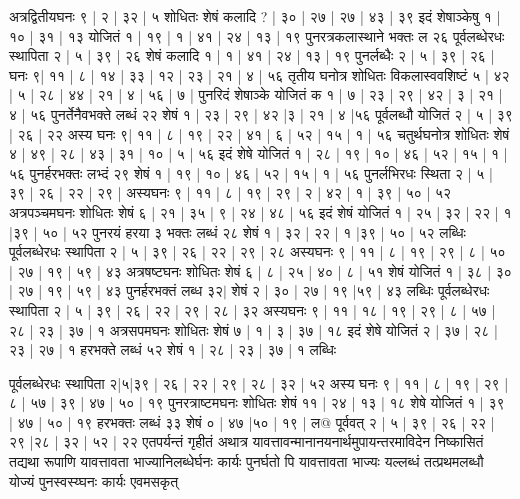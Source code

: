 \documentclass[12pt]{article}
\begin{document}
{अत्रद्वितीयघनः ९ | २ | ३२ | ५ शोधितः शेषं कलादि ? | ३० | २७ | २७ | ४३ | ३९ इदं शेषाञ्केषु १ |
१० | ३१ | १३ योजितं १ | १९ | १ | ४१ | २४ | १३ | १९ पुनरत्रकलास्थाने भक्तः ल २६ पूर्वलब्धेरधः
स्थापिता २ | ५ | ३९ | २६ शेषं कलादि १ | १ | ४१ | २४ | १३ | १९ पुनर्लब्धैः २ | ५ | ३९ | २६ | घनः ९| ११ |
८ | १४ | ३३ | १२ | २३ | २१ | ४ | ५६ तृतीय घनोत्र शोधितः विकलास्ववशिष्टं ५ | ४२ | ५ | २८ | ४४ | २१ | ४ |
५६ | ७ | पुनरिदं शेषाञ्के योजितं क १ | ७ | २३ | २९ | ४२ | ३ | २१ | ४ | ५६ पुनर्तेनैवभक्ते लब्धं
२२ शेषं १ | २३ | २९ | ४२ |३ | २१ | ४ |५६ पूर्वलब्धौ योजितं २ | ५ | ३९ | २६ | २२ अस्य घनः ९| ११ | ८ |
१९ | २२ | ४१ | ६ | ५२ | १५ | १ | ५६ चतुर्थघनोत्र शोधितः शेषं ४ | ४९ | २८ | ४३ | ३१ | १० | ५ | ५६ इदं
शेषे योजितं १ | २८ | १९ | १० | ४६ | ५२ | १५ | १ | ५६ पुनर्हरभक्तः लभ्दं २९ शेषं १ | १९ | १० | ४६
| ५२ | १५ | १ | ५६ पुनर्लभिरधः स्थिता २ | ५ | ३९ | २६ | २२ | २९ | अस्यघनः ९ | ११ | ८ | १९ | २९ | २ | ४२ | १
| ३९ | ५० | ५२ अत्रपञ्चमघनः शोधितः शेषं ६ | २१ | ३५ | ९ | २४ | ४८ | ५६ इदं शेषं योजितं
१ | २५ | ३२ | २२ | १ |३९ | ५० | ५२ पुनरयं हरया ३ भक्तः लब्धं २८ शेषं १ | ३२ | २२ | १ |३९ | ५० |
५२ लब्धिः पूर्वलब्धेरधः स्थापिता २ | ५ | ३९ | २६ | २२ | २९ | २८ अस्यघनः ९ | ११ | ८ | १९ | २९ | ८ | ५०
| २७ | १९ | ५९ | ४३ अत्रषष्टघनः शोधितः शेषं ६ | ८ | २५ | ४० | ८ | ५१ शेषं योजितं १ | ३८ | ३० |
२७ | १९ | ५९ | ४३ पुनर्हरभक्तं लब्ध ३२$|$
शेषं २ | ३० | २७ | १९ |५९ | ४३ लब्धिः पूर्वलब्धेरधः
स्थापिता २ | ५ | ३९ | २६ | २२ | २९ | २८ | ३२ अस्यघनः ९ | ११ | १८ | १९ | २९ | ८ | ५७ | २८ | २३ | ३७ | १ अत्रसपमघनः शोधितः शेषं ७ | १ | ३ | ३७ | १८ इदं शेषे योजितं २ | ३७ | २८ | २३ | २७ | १ हरभक्ते लब्धं ५२ शेषं १ | २८ | २३ | ३७ | १ लब्धिः

पूर्वलब्धेरधः स्थापिता २|५|३९ | २६ | २२ | २९ | २८ | ३२ | ५२ अस्य घनः ९ | ११ | ८ | १९ | २९ | ८ | ५७ | ३९ | ४७ | ५० | १९ पुनरत्राष्टमघनः शोधितः शेषं ११ | २४ | १३ | १८
शेषे योजितं १ | ३९ | ४७ | ५० | १९ हरभक्तः लब्धं ३३ शेषं ० | ४७ |५० | १९ |
ल@
पूर्ववत् २ | ५ | ३९ | २६ | २२ | २९ |२८ | ३२ | ५२ | २२ एतपर्यन्तं गृहीतं अथात्र यावत्तावन्मानानयनार्थमुपायन्तरमाविदेन निष्कासितं तद्यथा रूपाणि यावत्तावता भाज्यानिलब्धेर्घनः कार्यः पुनर्घतो पि यावत्तावता भाज्यः यल्लब्धं तत्प्रथमलब्धौ योज्यं पुनस्वस्य्घनः कार्यः एवमसकृत्

}
\end{document}
